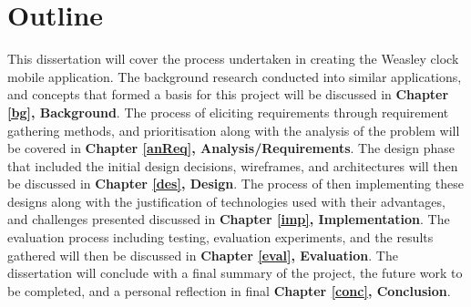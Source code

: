 \section{Outline}

This dissertation will cover the process undertaken in creating the Weasley clock mobile application. The background research conducted into similar applications, and concepts that formed a basis for this project will be discussed in \textbf{Chapter \ref{bg}, Background}. The process of eliciting requirements through requirement gathering methods, and prioritisation along with the analysis of the problem will be covered in \textbf{Chapter \ref{anReq}, Analysis/Requirements}. The design phase that included the initial design decisions, wireframes, and architectures will then be discussed in \textbf{Chapter \ref{des}, Design}. The process of then implementing these designs along with the justification of technologies used with their advantages, and challenges presented discussed in \textbf{Chapter \ref{imp}, Implementation}. The evaluation process including testing, evaluation experiments, and the results gathered will then be discussed in \textbf{Chapter \ref{eval}, Evaluation}. The dissertation will conclude with a final summary of the project, the future work to be completed, and a personal reflection in final \textbf{Chapter \ref{conc}, Conclusion}.